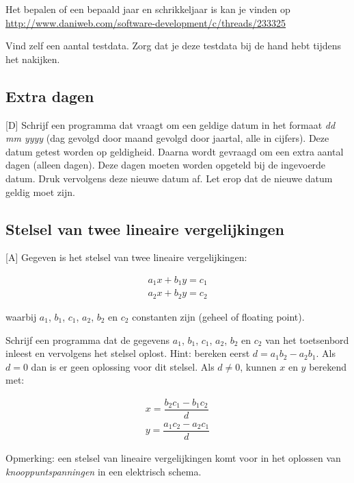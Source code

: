 \documentclass[a4paper,10pt,fleqn,twoside]{article}
\begin{document}
Het bepalen of een bepaald jaar en schrikkeljaar is kan je vinden op \url{http://www.daniweb.com/software-development/c/threads/233325}

Vind zelf een aantal testdata. Zorg dat je deze testdata bij de hand hebt tijdens het nakijken.

\subsection{Extra dagen}[D]
Schrijf een programma dat vraagt om een geldige datum in het formaat \textsl{dd mm yyyy} (dag gevolgd door maand gevolgd door jaartal, alle in cijfers). Deze datum getest worden op geldigheid. Daarna wordt gevraagd om een extra aantal dagen (alleen dagen). Deze dagen moeten worden opgeteld bij de ingevoerde datum. Druk vervolgens deze nieuwe datum af. Let erop dat de nieuwe datum geldig moet zijn.

\subsection{Stelsel van twee lineaire vergelijkingen}[A]
Gegeven is het stelsel van twee lineaire vergelijkingen:

\begin{equation*}
\begin{split}
a_1x + b_1y = c_1\\
a_2x + b_2y = c_2
\end{split}
\end{equation*}

waarbij $a_1$, $b_1$, $c_1$, $a_2$, $b_2$ en $c_2$ constanten zijn (geheel of floating point).

Schrijf een programma dat de gegevens $a_1$, $b_1$, $c_1$, $a_2$, $b_2$ en $c_2$ van het toetsenbord inleest en vervolgens het stelsel oplost. Hint: bereken eerst $d=a_1b_2-a_2b_1$. Als $d=0$ dan is er geen oplossing voor dit stelsel. Als $d\neq0$, kunnen $x$ en $y$ berekend met:

\begin{equation*}
\begin{split}
x = \dfrac{b_2c_1-b_1c_2}{d}\\
y = \dfrac{a_1c_2-a_2c_1}{d}
\end{split}
\end{equation*}

Opmerking: een stelsel van lineaire vergelijkingen komt voor in het oplossen van \textsl{knooppuntspanningen} in een elektrisch schema.

\clearpage
\end{document}

